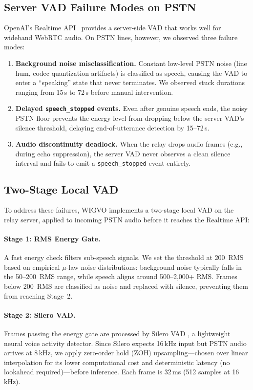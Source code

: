 \documentclass[11pt]{article}
\begin{document}
\subsection{Server VAD Failure Modes on PSTN}

OpenAI's Realtime API~\citep{openai_realtime_api_2024} provides a server-side VAD that works well for wideband WebRTC audio. On PSTN lines, however, we observed three failure modes:

\begin{enumerate}
    \item \textbf{Background noise misclassification.} Constant low-level PSTN noise (line hum, codec quantization artifacts) is classified as speech, causing the VAD to enter a ``speaking'' state that never terminates. We observed stuck durations ranging from 15\,s to 72\,s before manual intervention.
    \item \textbf{Delayed \texttt{speech\_stopped} events.} Even after genuine speech ends, the noisy PSTN floor prevents the energy level from dropping below the server VAD's silence threshold, delaying end-of-utterance detection by 15--72\,s.
    \item \textbf{Audio discontinuity deadlock.} When the relay drops audio frames (e.g., during echo suppression), the server VAD never observes a clean silence interval and fails to emit a \texttt{speech\_stopped} event entirely.
\end{enumerate}

\subsection{Two-Stage Local VAD}

To address these failures, WIGVO implements a two-stage local VAD on the relay server, applied to incoming PSTN audio before it reaches the Realtime API:

\paragraph{Stage 1: RMS Energy Gate.}
A fast energy check filters sub-speech signals. We set the threshold at 200~RMS based on empirical $\mu$-law noise distributions: background noise typically falls in the 50--200~RMS range, while speech aligns around 500--2{,}000+ RMS. Frames below 200~RMS are classified as noise and replaced with silence, preventing them from reaching Stage~2.

\paragraph{Stage 2: Silero VAD.}
Frames passing the energy gate are processed by Silero VAD \citep{silero_vad_2021}, a lightweight neural voice activity detector. Since Silero expects 16\,kHz input but PSTN audio arrives at 8\,kHz, we apply zero-order hold (ZOH) upsampling---chosen over linear interpolation for its lower computational cost and deterministic latency (no lookahead required)---before inference. Each frame is 32\,ms (512 samples at 16\,kHz).
\end{document}
